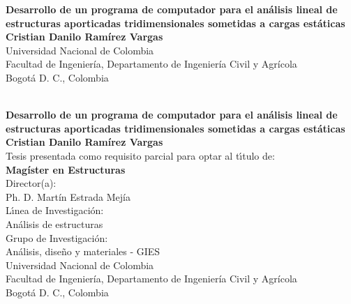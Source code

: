 \begin{center}
\begin{figure}
\centering%
%
\end{figure}
\thispagestyle{empty} \vspace*{2.0cm} \textbf{\huge
Desarrollo de un programa de computador para el análisis lineal de estructuras aporticadas tridimensionales sometidas a cargas estáticas}\\[4.5cm]
\Large\textbf{Cristian Danilo Ramírez Vargas}\\[4.5cm]
\small Universidad Nacional de Colombia\\
Facultad de Ingeniería, Departamento de Ingeniería Civil y Agrícola\\
Bogotá D. C., Colombia\\
\the\year\\
\end{center}

\newpage{\pagestyle{empty}\cleardoublepage}

\newpage
\begin{center}
\thispagestyle{empty} \vspace*{0cm} \textbf{\huge
Desarrollo de un programa de computador para el análisis lineal de estructuras aporticadas tridimensionales sometidas a cargas estáticas}\\[1.0cm]
\Large\textbf{Cristian Danilo Ramírez Vargas}\\[3.0cm]
\small Tesis presentada como requisito parcial para optar al
t\'{\i}tulo de:\\
\textbf{Magíster en Estructuras}\\[2.5cm]
Director(a):\\
Ph. D. Martín Estrada Mejía\\[2.0cm]
L\'{\i}nea de Investigaci\'{o}n:\\
Análisis de estructuras\\
Grupo de Investigaci\'{o}n:\\
Análisis, diseño y materiales - GIES\\[2.0cm]
Universidad Nacional de Colombia\\
Facultad de Ingeniería, Departamento de Ingeniería Civil y Agrícola\\
Bogotá D. C., Colombia\\
\the\year\\
\end{center}

\newpage{\pagestyle{empty}\cleardoublepage}

